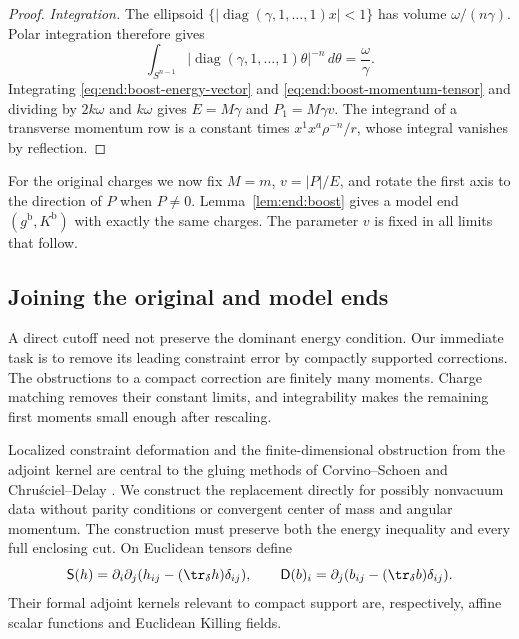 \begin{proof}
\emph{Integration.} The ellipsoid
$\{|\operatorname{diag}(\gamma,1,\ldots,1)x|<1\}$
has volume $\omega/(n\gamma)$.  Polar integration therefore gives
\begin{equation}\label{eq:end:ellipsoid-integral}
 \int_{S^{n-1}}|\operatorname{diag}(\gamma,1,\ldots,1)\theta|^{-n}
 \,d\theta=\frac{\omega}{\gamma}.
\end{equation}
Integrating \eqref{eq:end:boost-energy-vector} and
\eqref{eq:end:boost-momentum-tensor} and dividing by $2k\omega$ and
$k\omega$ gives $E=M\gamma$ and $P_1=M\gamma v$.
The integrand of a transverse momentum row is a constant times
$x^1x^a\rho^{-n}/r$, whose integral vanishes by reflection.
\end{proof}

For the original charges we now fix $M=m$, $v=|P|/E$, and rotate
the first axis to the direction of $P$ when $P\ne0$.
Lemma~\ref{lem:end:boost} gives a model end $(g^{\mathrm b},K^{\mathrm b})$
with exactly the same charges.  The parameter $v$ is fixed in all
limits that follow.

\subsection{Joining the original and model ends}

A direct cutoff need not preserve the dominant energy condition.
Our immediate task is to remove its leading constraint error by
compactly supported corrections.  The obstructions to a compact
correction are finitely many moments.  Charge matching removes their
constant limits, and integrability makes the remaining first moments
small enough after rescaling.

Localized constraint deformation and the finite-dimensional obstruction
from the adjoint kernel are central to the gluing methods of
Corvino--Schoen \cite{CorvinoSchoen2006} and Chru\'sciel--Delay
\cite{ChruscielDelay2003}.  We construct the replacement directly for
possibly nonvacuum data without parity conditions or convergent center
of mass and angular momentum.  The construction must preserve both
the energy inequality and every full enclosing cut.  On Euclidean
tensors define
\begin{equation}\label{eq:end:linearized-operators}
 \mathsf S(h)=\partial_i\partial_j(h_{ij}-(\tr_\delta h)\delta_{ij}),
 \qquad
 \mathsf D(b)_i=\partial_j(b_{ij}-(\tr_\delta b)\delta_{ij}).
\end{equation}
Their formal adjoint kernels relevant to compact support are,
respectively, affine scalar functions and Euclidean Killing fields.

